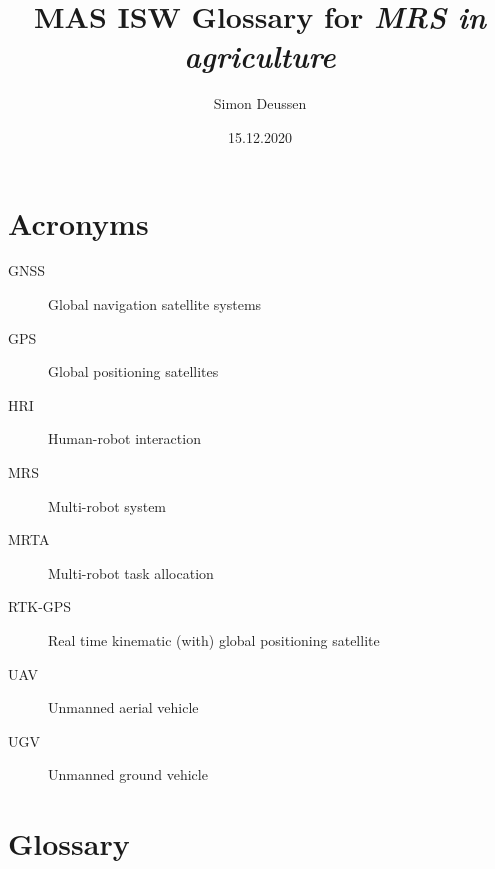 \documentclass{article}
\title{MAS ISW Glossary for \emph{MRS in agriculture}}
\date{15.12.2020}
\author{Simon Deussen}
\begin{document}
\maketitle
{}


\section{Acronyms}

\begin{description}
    \item[GNSS] Global navigation satellite systems
    \item[GPS] Global positioning satellites
    \item[HRI] Human-robot interaction
    \item[MRS] Multi-robot system
    \item[MRTA] Multi-robot task allocation
    \item[RTK-GPS] Real time kinematic (with) global positioning satellite
    \item[UAV] Unmanned aerial vehicle
    \item[UGV] Unmanned ground vehicle
\end{description}

\section{Glossary}
\end{document}
